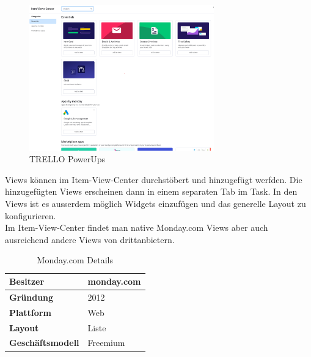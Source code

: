 \begin{figure}[H]
    \begin{center}
        \includegraphics[width=8cm]{../content/images/monday.com/MondayItemViewsCenter.png}
        \caption{TRELLO PowerUps}
    \end{center}
\end{figure}

Views können im Item-View-Center durchstöbert und hinzugefügt werfden. 
Die hinzugefügten Views erscheinen dann in einem separaten Tab im Task. In den Views ist es ausserdem möglich Widgets einzufügen
und das generelle Layout zu konfigurieren.\\
Im Item-View-Center findet man native Monday.com Views aber auch ausreichend andere Views von drittanbietern.

\begin{table}[H]
    \centering
    \settowidth{}
    \setlength\extrarowheight{2pt}
    \begin{tabulary}{1.0\textwidth}{|L|L|}
      \hline
      \textbf{Besitzer} &
      monday.com\\
      \hline
      \textbf{Gründung} &
      2012\\
      \hline
      \textbf{Plattform} &
      Web\\
      \hline
      \textbf{Layout} &
      Liste\\
      \hline
      \textbf{Geschäftsmodell} &
      Freemium\\
      \hline
    \end{tabulary}
    \caption{Monday.com Details}
  \end{table}


